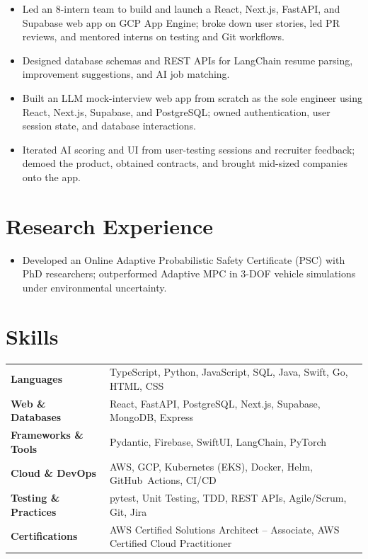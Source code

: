\documentclass[11pt, letterpaper]{article}
\begin{document}
\begin{itemize}
  \item Led an 8-intern team to build and launch a React, Next.js, FastAPI, and Supabase web app on GCP App Engine; broke down user stories, led PR reviews, and mentored interns on testing and Git workflows.
  \item Designed database schemas and REST APIs for LangChain resume parsing, improvement suggestions, and AI job matching.
\end{itemize}

\begin{itemize}
  \item Built an LLM mock-interview web app from scratch as the sole engineer using React, Next.js, Supabase, and PostgreSQL; owned authentication, user session state, and database interactions.
  \item Iterated AI scoring and UI from user-testing sessions and recruiter feedback; demoed the product, obtained contracts, and brought mid-sized companies onto the app.
\end{itemize}

\section{Research Experience}
\begin{itemize}
  \item Developed an Online Adaptive Probabilistic Safety Certificate (PSC) with PhD researchers; outperformed Adaptive MPC in 3-DOF vehicle simulations under environmental uncertainty.
\end{itemize}

\section{Skills}
\begin{tabularx}{\textwidth}{@{}l @{\hspace{7pt}} >{\raggedright\arraybackslash}X@{}}
  \textbf{Languages} & TypeScript, Python, JavaScript, SQL, Java, Swift, Go, HTML, CSS \\[1pt]
  \textbf{Web \& Databases} & React, FastAPI, PostgreSQL, Next.js, Supabase, MongoDB, Express \\[1pt]
  \textbf{Frameworks \& Tools} & Pydantic, Firebase, SwiftUI, LangChain, PyTorch \\[1pt]
  \textbf{Cloud \& DevOps} & AWS, GCP, Kubernetes (EKS), Docker, Helm, GitHub~Actions, CI/CD \\[1pt]
  \textbf{Testing \& Practices} & pytest, Unit Testing, TDD, REST APIs, Agile/Scrum, Git, Jira \\[1pt]
  \textbf{Certifications} & AWS Certified Solutions Architect -- Associate, AWS Certified Cloud Practitioner \\
\end{tabularx}
\end{document}
